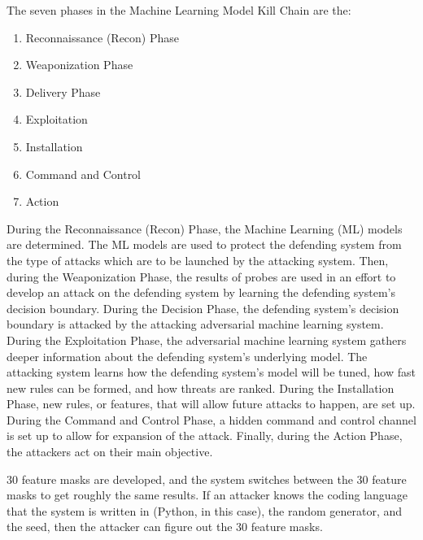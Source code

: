 \documentclass[conference]{IEEEtran}
\begin{document}
The seven phases in the Machine Learning Model Kill Chain are the: 
\begin{enumerate}
\item Reconnaissance (Recon) Phase
\item Weaponization Phase
\item Delivery Phase
\item Exploitation
\item Installation
\item Command and Control
\item Action
\end{enumerate} 

During the Reconnaissance (Recon) Phase, the Machine Learning (ML) models are determined. The ML models are used to protect the defending system from the type of attacks which are to be launched by the attacking system. Then, during the Weaponization Phase, the results of probes are used in an effort to develop an attack on the defending system by learning the defending system's decision boundary. During the Decision Phase, the defending system's decision boundary is attacked by the attacking adversarial machine learning system. During the Exploitation Phase, the adversarial machine learning system gathers deeper information about the defending system's underlying model. The attacking system learns how the defending system's model will be tuned, how fast new rules can be formed, and how threats are ranked. During the Installation Phase, new rules, or features, that will allow future attacks to happen, are set up. During the Command and Control Phase, a hidden command and control channel is set up to allow for expansion of the attack. Finally, during the Action Phase, the attackers act on their main objective\cite{Nyugen 2017}. 

\begin{math}30\end{math} feature masks are developed, and the system switches between the \begin{math}30\end{math} feature masks to get roughly the same results. If an attacker knows the coding language that the system is written in (Python, in this case), the random generator, and the seed, then the attacker can figure out the \begin{math}30\end{math} feature masks. 
\end{document}
